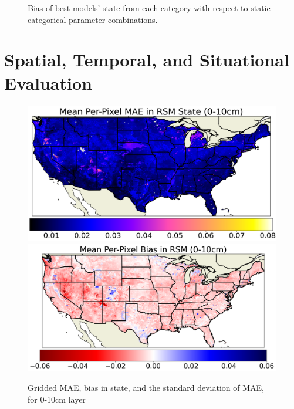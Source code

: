 \begin{figure}[hp!]

    \caption{Bias of best models' state from each category with respect to static categorical parameter combinations.}
    \label{best-static-bias}
\end{figure}

\section{Spatial, Temporal, and Situational Evaluation}

\begin{figure}[hp!]
    \centering

    \includegraphics[width=.48\linewidth,draft=false]{figures/grid-eval_lstm-rsm-9_full/eval-grid_full_lstm-rsm-9_rsm-10_spatial-stats_abs-err_state-err-abs-mean.png}
    \includegraphics[width=.48\linewidth,draft=false]{figures/grid-eval_lstm-rsm-9_full/eval-grid_full_lstm-rsm-9_rsm-10_spatial-stats_bias_state-err-bias-mean.png}


    \caption{Gridded MAE, bias in state, and the standard deviation of MAE, for 0-10cm layer}
    \label{lstm-rsm-9-grid-rsm-10}
\end{figure}

